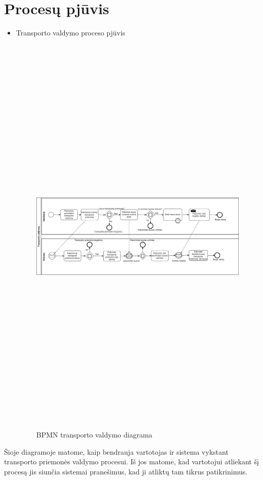 \documentclass[oneside]{VUMIFPSkursinis}
\begin{document}
	\section{Procesų pjūvis}
	\begin{itemize}
	\item Transporto valdymo proceso pjūvis
	\begin{figure}[H]
		\centering	
	\includegraphics[width=18cm,height=20cm,keepaspectratio]{BPMN_transportoValdymas.png}
	\caption{BPMN transporto valdymo diagrama}
	\label{fig:BPMN_transportoValdymas}
\end{figure}
\end{itemize}
Šioje diagramoje matome, kaip bendrauja vartotojas ir sistema vykstant transporto priemonės valdymo procesui. Iš jos matome, kad vartotojui atliekant šį procesą jis siunčia sistemai pranešimus, kad ji atliktų tam tikrus patikrinimus.
\end{document}
